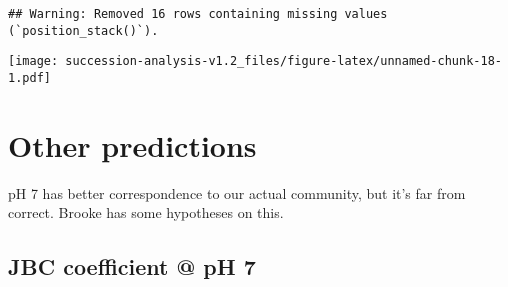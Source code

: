\documentclass[
]{article}
\newenvironment{Shaded}{\begin{snugshade}}{\end{snugshade}}
\newcommand{\AttributeTok}[1]{\textcolor[rgb]{0.13,0.29,0.53}{#1}}
\newcommand{\DecValTok}[1]{\textcolor[rgb]{0.00,0.00,0.81}{#1}}
\newcommand{\FunctionTok}[1]{\textcolor[rgb]{0.13,0.29,0.53}{\textbf{#1}}}
\newcommand{\NormalTok}[1]{#1}
\newcommand{\OtherTok}[1]{\textcolor[rgb]{0.56,0.35,0.01}{#1}}
\newcommand{\SpecialCharTok}[1]{\textcolor[rgb]{0.81,0.36,0.00}{\textbf{#1}}}
\newcommand{\StringTok}[1]{\textcolor[rgb]{0.31,0.60,0.02}{#1}}
\begin{document}
\begin{Shaded}
\end{Shaded}

\begin{verbatim}
## Warning: Removed 16 rows containing missing values (`position_stack()`).
\end{verbatim}

\texttt{[image: succession-analysis-v1.2\_files/figure-latex/unnamed-chunk-18-1.pdf]}

\hypertarget{other-predictions}{%
\section{Other predictions}\label{other-predictions}}

pH 7 has better correspondence to our actual community, but it's far
from correct. Brooke has some hypotheses on this.

\hypertarget{jbc-coefficient-ph-7}{%
\subsection{JBC coefficient @ pH 7}\label{jbc-coefficient-ph-7}}
\end{document}
